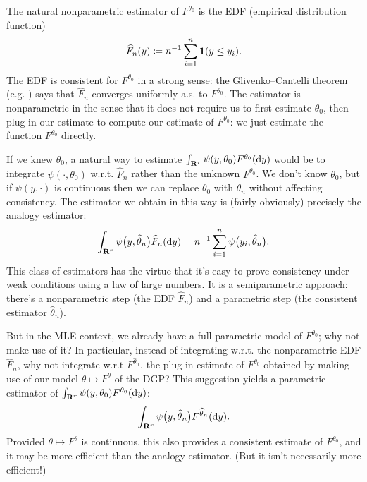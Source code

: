 \documentclass[11pt,letterpaper,reqno,oneside]{article}
\begin{document}
The natural nonparametric estimator of $F^{\theta_0}$ is the EDF (empirical distribution function)
%
\begin{equation*}
	\widehat{F}_n(y) 
	\coloneqq n^{-1} \sum_{i=1}^n \boldsymbol{1}(y \leq y_i) .
\end{equation*}
%
The EDF is consistent for $F^{\theta_0}$ in a strong sense: the Glivenko--Cantelli theorem (e.g. \textcite[][p. 269]{Billingsley1995}) says that $\widehat{F}_n$ converges uniformly a.s. to $F^{\theta_0}$. The estimator is nonparametric in the sense that it does not require us to first estimate $\theta_0$, then plug in our estimate to compute our estimate of $F^{\theta_0}$: we just estimate the function $F^{\theta_0}$ directly.

If we knew $\theta_0$, a natural way to estimate $\int_{\mathbf{R}^r} \psi(y,\theta_0) F^{\theta_0}(\mathrm{d} y)$ would be to integrate $\psi(\cdot,\theta_0)$ w.r.t. $\widehat{F}_n$ rather than the unknown $F^{\theta_0}$. We don't know $\theta_0$, but if $\psi(y,\cdot)$ is continuous then we can replace $\theta_0$ with $\widehat{\theta}_n$ without affecting consistency. The estimator we obtain in this way is (fairly obviously) precisely the analogy estimator:
%
\begin{equation*}
	\int_{\mathbf{R}^r} \psi\bigl( y, \widehat{\theta}_n \bigr) 
	\widehat{F}_n(\mathrm{d} y)
	= n^{-1} \sum_{i=1}^n \psi\bigl( y_i, \widehat{\theta}_n \bigr) .
\end{equation*}
%
This class of estimators has the virtue that it's easy to prove consistency under weak conditions using a law of large numbers. It is a semiparametric approach: there's a nonparametric step (the EDF $\widehat{F}_n$) and a parametric step (the consistent estimator $\widehat{\theta}_n$).

But in the MLE context, we already have a full parametric model of $F^{\theta_0}$; why not make use of it? In particular, instead of integrating w.r.t. the nonparametric EDF $\widehat{F}_n$, why not integrate w.r.t $F^{\widehat{\theta}_n}$, the plug-in estimate of $F^{\theta_0}$ obtained by making use of our model $\theta \mapsto F^\theta$ of the DGP? This suggestion yields a parametric estimator of $\int_{\mathbf{R}^r} \psi(y,\theta_0) F^{\theta_0}(\mathrm{d} y)$:
%
\begin{equation*}
	\int_{\mathbf{R}^r} \psi\bigl( y, \widehat{\theta}_n \bigr) 
	F^{\widehat{\theta}_n}(\mathrm{d} y) .
\end{equation*}
%
Provided $\theta \mapsto F^\theta$ is continuous, this also provides a consistent estimate of $F^{\theta_0}$, and it may be more efficient than the analogy estimator. (But it isn't necessarily more efficient!)
\end{document}
